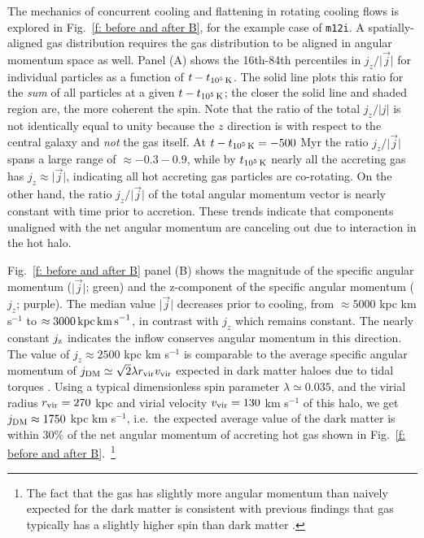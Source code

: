 \documentclass[fleqn,usenatbib]{mnras}
\newcommand{\tcools}{t_{10^5\,{\rm K}}}
\newcommand{\Rvir}{r_{\rm vir}}
\newcommand{\vvir}{v_{\rm vir}}
\begin{document}
The mechanics of concurrent cooling and flattening in rotating cooling flows is explored in Fig.~\ref{f: before and after B}, for the example case of \texttt{m12i}.
A spatially-aligned gas distribution requires the gas distribution to be aligned in angular momentum space as well.
Panel (A) shows the 16th-84th percentiles in $j_z/\vert\vec j\vert$ for individual particles as a function of $t-\tcools$.
The solid line plots this ratio for the {\em sum} of all particles at a given $t-\tcools$; the closer the solid line and shaded region are, the more coherent the spin.
Note that the ratio of the total $j_z/\vert j \vert$ is not identically equal to unity because the $z$ direction is with respect to the central galaxy and {\em not} the gas itself.
At $t-\tcools=-500$ Myr the ratio $j_z/\vert\vec j\vert$ spans a large range of $\approx -0.3 - 0.9$, while by $\tcools$ nearly all the accreting gas has $j_z\approx\vert\vec j\vert$, indicating all hot accreting gas particles are co-rotating.
On the other hand, the ratio $j_z/\vert\vec j\vert$ of the total angular momentum vector is nearly constant with time prior to accretion. 
These trends indicate that components unaligned with the net angular momentum are canceling out due to interaction in the hot halo.

Fig.~\ref{f: before and after B} panel (B) shows the magnitude of the specific angular momentum ($\vert \vec j \vert$; green) and the z-component of the specific angular momentum ($j_z$; purple).
The median value $\vert \vec j \vert$ decreases prior to cooling, from $\approx 5000$ kpc km s$^{-1}$ to $\approx 3000\,{\rm kpc\,km\,s}^{-1}$, in contrast with  $j_z$ which remains constant.
The nearly constant $j_{\rm z}$ indicates the inflow conserves angular momentum in this direction. 
The value of $j_z\approx 2500$ kpc km s$^{-1}$ is comparable to the average specific angular momentum of $j_{\rm DM} \simeq \sqrt{2}\lambda \Rvir \vvir$ expected in dark matter haloes due to tidal torques \citep[e.g.][]{Bullock2001}.
Using a typical dimensionless spin parameter $\lambda \simeq 0.035$, and the virial radius $\Rvir=270$ kpc and virial velocity $\vvir=130$ km s$^{-1}$ of this halo, we get $j_{\rm DM}\approx1750$ kpc km s$^{-1}$, i.e.~the expected average value of the dark matter is within $30\%$ of the net angular momentum of accreting hot gas shown in Fig.~\ref{f: before and after B}.~\footnote{The fact that the gas has slightly more angular momentum than naively expected for the dark matter is consistent with previous findings that gas typically has a slightly higher spin than dark matter \citep[e.g.][]{Stewart2017}.}
\end{document}
